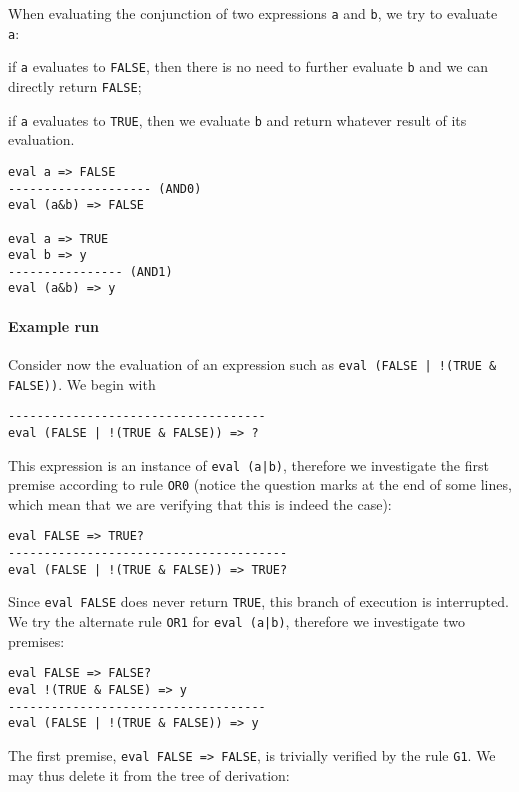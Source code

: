When evaluating the conjunction of two expressions \texttt{a} and \texttt{b}, we try to evaluate \texttt{a}:
\begin{inparaenum}
\item if \texttt{a} evaluates to \texttt{FALSE}, then there is no need to further evaluate \texttt{b} and we can directly return \texttt{FALSE};
\item if \texttt{a} evaluates to \texttt{TRUE}, then we evaluate \texttt{b} and return whatever result of its evaluation.
\end{inparaenum}

\begin{lstlisting}
eval a => FALSE
-------------------- (AND0)
eval (a&b) => FALSE

eval a => TRUE
eval b => y
---------------- (AND1)
eval (a&b) => y
\end{lstlisting}


\paragraph{Example run}
Consider now the evaluation of an expression such as \texttt{eval (FALSE | !(TRUE \& FALSE))}. We begin with

\begin{lstlisting}
------------------------------------
eval (FALSE | !(TRUE & FALSE)) => ?
\end{lstlisting}

This expression is an instance of \texttt{eval (a|b)}, therefore we investigate the first premise according to rule \texttt{OR0} (notice the question marks at the end of some lines, which mean that we are verifying that this is indeed the case):

\begin{lstlisting}
eval FALSE => TRUE?
---------------------------------------
eval (FALSE | !(TRUE & FALSE)) => TRUE?
\end{lstlisting}

Since \texttt{eval FALSE} does never return \texttt{TRUE}, this branch of execution is interrupted. We try the alternate rule \texttt{OR1} for \texttt{eval (a|b)}, therefore we investigate two premises:

\begin{lstlisting}
eval FALSE => FALSE?
eval !(TRUE & FALSE) => y
------------------------------------
eval (FALSE | !(TRUE & FALSE)) => y
\end{lstlisting}

The first premise, \texttt{eval FALSE => FALSE}, is trivially verified by the rule \texttt{G1}. We may thus delete it from the tree of derivation:


